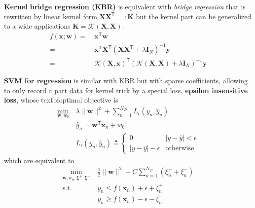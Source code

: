 
\textbf{Kernel bridge regression (KBR)} is equivalent with \textit{bridge regression} that is rewritten by linear kernel form $\mathbf{XX}^\mathsf{T}=:\mathbf{K}$
but the kernel part can be generalized to a wide applications $\mathbf{K}=\mathcal{K}(\mathbf{X},\mathbf{X})$. 
\begin{align}
    f(\bm{x};\bm{w}) 
    =&~ \bm{x}^\mathsf{T}\bm{w} \\
    =&~ \bm{x}^\mathsf{T}\mathbf{X}^\mathsf{T}(\mathbf{XX}^\mathsf{T}+\lambda\mathbf{I}_N)^{-1}\bm{y}\\
    =&~ \mathcal{K}(\mathbf{X},\bm{x})^\mathsf{T}(\mathcal{K}(\mathbf{X},\mathbf{X})+\lambda\mathbf{I}_N)^{-1}\bm{y}
\end{align}

\textbf{SVM for regression} is similar with KBR but with sparse coefficients, allowing to only record a part data for kernel trick by a special loss, \textbf{epsilon insensitive loss},
whose textbf{optimal objective} is 
\begin{align}
    \min_{\bm{w},w_0}&~\lambda\|\bm{w}\|^2 + \sum_{n=1}^{N_\mathcal{D}}L_{\epsilon}(y_n,\hat{y}_n) \\
    &~\hat{y}_n = \bm{w}^\mathsf{T}\bm{x}_n + w_0 \\
    &~L_{\epsilon}(y_n,\hat{y}_n) \triangleq  
    \begin{cases}
    0                       & |y-\hat{y}| < \epsilon \\
    |y-\hat{y}|-\epsilon    & \text{otherwise}
    \end{cases}
\end{align}
which are equivalent to
\begin{align}
    \min_{\bm{w},w_0,\bm{\xi}^+,\bm{\xi}^-}&~\frac{1}{2}\|\bm{w}\|^2 + C\sum_{n=1}^{N_\mathcal{D}}(\xi^+_n+\xi^-_n) \\
    \mathrm{s.t.}
    &~y_n\leq f(\bm{x}_n) + \epsilon + \xi^+_n \\
    &~y_n\geq f(\bm{x}_n) - \epsilon - \xi^-_n 
\end{align}


